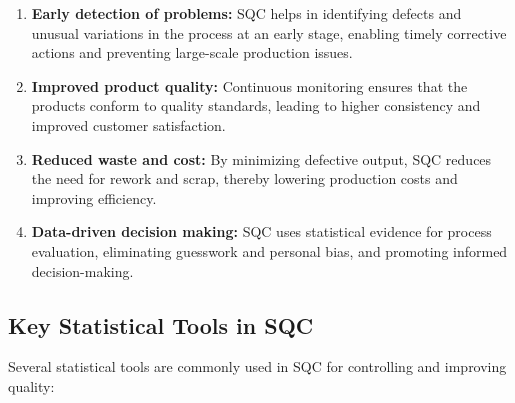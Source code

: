 \documentclass[twoside]{book}
\begin{document}
\begin{enumerate}
    \item \textbf{Early detection of problems:} SQC helps in identifying defects and unusual variations in the process at an early stage, enabling timely corrective actions and preventing large-scale production issues.

    \item \textbf{Improved product quality:} Continuous monitoring ensures that the products conform to quality standards, leading to higher consistency and improved customer satisfaction.

    \item \textbf{Reduced waste and cost:} By minimizing defective output, SQC reduces the need for rework and scrap, thereby lowering production costs and improving efficiency.

    \item \textbf{Data-driven decision making:} SQC uses statistical evidence for process evaluation, eliminating guesswork and personal bias, and promoting informed decision-making.
\end{enumerate}

\subsection{Key Statistical Tools in SQC}

Several statistical tools are commonly used in SQC for controlling and improving quality:
\end{document}
